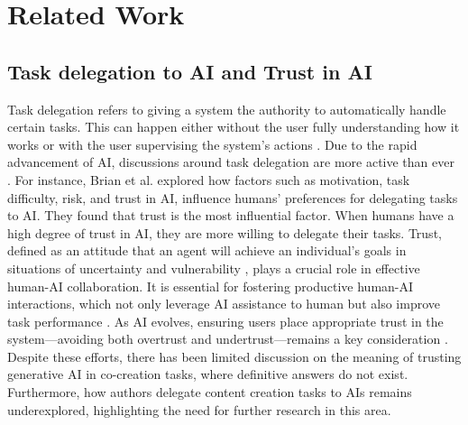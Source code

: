 \section{Related Work}
\subsection{Task delegation to AI and Trust in AI}
Task delegation refers to giving a system the authority to automatically handle certain tasks. This can happen either without the user fully understanding how it works or with the user supervising the system’s actions \cite{wiener1980flight}. Due to the rapid advancement of AI, discussions around task delegation are more active than ever \cite{lubars2019ask}. For instance, Brian et al. \cite{lubars2019ask} explored how factors such as motivation, task difficulty, risk, and trust in AI, influence humans’ preferences for delegating tasks to AI. They found that trust is the most influential factor. When humans have a high degree of trust in AI, they are more willing to delegate their tasks. Trust, defined as an attitude that an agent will achieve an individual's goals in situations of uncertainty and vulnerability \cite{lee2004trust}, plays a crucial role in effective human-AI collaboration. It is essential for fostering productive human-AI interactions, which not only leverage AI assistance to human but also improve task performance \cite{bansal2021does, salimzadeh2024dealing}. As AI evolves, ensuring users place appropriate trust in the system—avoiding both overtrust and undertrust—remains a key consideration \cite{weisz2024design}. Despite these efforts, there has been limited discussion on the meaning of trusting generative AI in co-creation tasks, where definitive answers do not exist. Furthermore, how authors delegate content creation tasks to AIs remains underexplored, highlighting the need for further research in this area.


